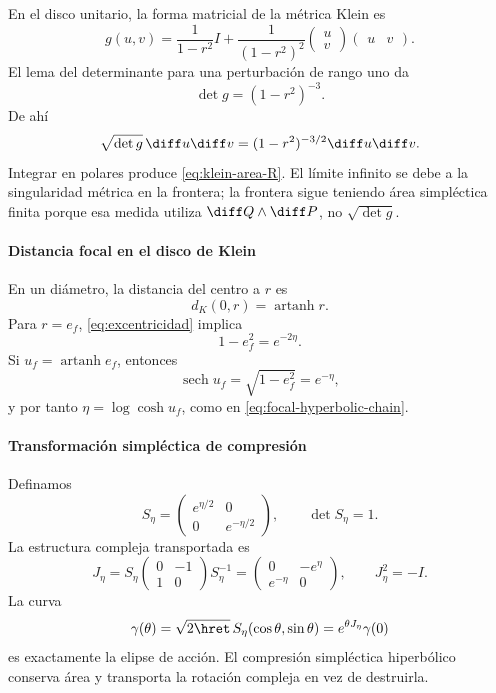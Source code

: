 En el disco unitario, la forma matricial de la métrica Klein es
\[
g(u,v)=\frac1{1-r^2}I
+\frac1{(1-r^2)^2}
\begin{pmatrix}u\\v\end{pmatrix}
\begin{pmatrix}u&v\end{pmatrix}.
\]
El lema del determinante para una perturbación de rango uno da
\[
\det g=(1-r^2)^{-3}.
\]
De ahí
\[
\sqrt{\det g}\,\diff u\diff v
=(1-r^2)^{-3/2}\diff u\diff v.
\]
Integrar en polares produce \eqref{eq:klein-area-R}. El límite infinito se
debe a la singularidad métrica en la frontera; la frontera sigue teniendo
área simpléctica finita porque esa medida utiliza \(\diff Q\wedge\diff P\),
no \(\sqrt{\det g}\).

\paragraph{Distancia focal en el disco de Klein}

En un diámetro, la distancia del centro a \(r\) es
\[
d_K(0,r)=\operatorname{artanh}r.
\]
Para \(r=e_f\), \eqref{eq:excentricidad} implica
\[
1-e_f^2=e^{-2\eta}.
\]
Si \(u_f=\operatorname{artanh}e_f\), entonces
\[
\operatorname{sech}u_f=\sqrt{1-e_f^2}=e^{-\eta},
\]
y por tanto \(\eta=\log\cosh u_f\), como en
\eqref{eq:focal-hyperbolic-chain}.

\paragraph{Transformación simpléctica de compresión}

Definamos
\begin{equation}
S_\eta=
\begin{pmatrix}e^{\eta/2}&0\\0&e^{-\eta/2}\end{pmatrix},
\qquad \det S_\eta=1.
\label{eq:compresión simpléctica}
\end{equation}
La estructura compleja transportada es
\begin{equation}
J_\eta=S_\eta
\begin{pmatrix}0&-1\\1&0\end{pmatrix}
S_\eta^{-1}
=\begin{pmatrix}0&-e^\eta\\e^{-\eta}&0\end{pmatrix},
\qquad J_\eta^2=-I.
\label{eq:Jeta}
\end{equation}
La curva
\[
\gamma(\theta)=\sqrt{2\hret}\,
S_\eta(\cos\theta,\sin\theta)
=e^{\theta J_\eta}\gamma(0)
\]
es exactamente la elipse de acción. El compresión simpléctica hiperbólico conserva área y
transporta la rotación compleja en vez de destruirla.

